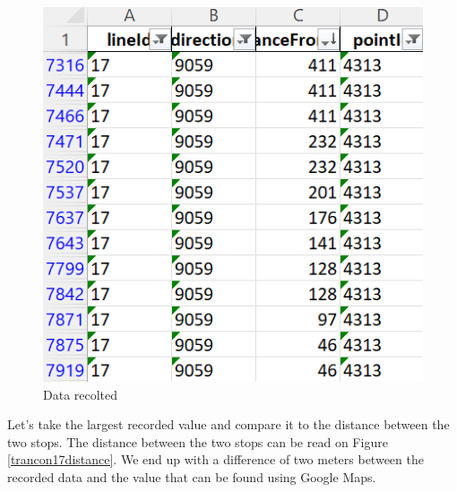 \documentclass[12pt]{report}
\begin{document}
	\begin{center}
		\begin{figure}
			\centering
			\includegraphics{images/excel position rt.png}
			\caption{Data recolted}
			\label{excelPositionRT}
		\end{figure}
	\end{center}
	
	\vspace{-2cm}	
	Let's take the largest recorded value and compare it to the distance between the two stops. The distance between the two stops can be read on Figure \ref{trancon17distance}. We end up with a difference of two meters between the recorded data and the value that can be found using Google Maps.
	
\end{document}
